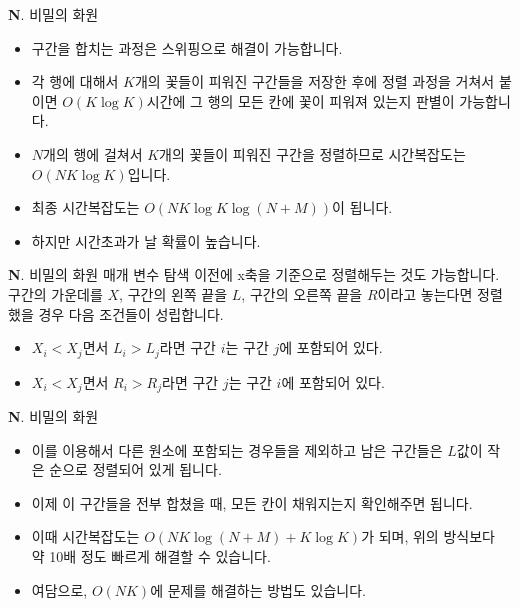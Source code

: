 \begin{frame}{\textbf{N}. 비밀의 화원}
    \begin{itemize}
        \item 구간을 합치는 과정은 스위핑으로 해결이 가능합니다. 
        \item 각 행에 대해서 $K$개의 꽃들이 피워진 구간들을 저장한 후에 정렬 과정을 거쳐서 붙이면 $O(K\log K)$시간에 그 행의 모든 칸에 꽃이 피워져 있는지 판별이 가능합니다.
        \item $N$개의 행에 걸쳐서 $K$개의 꽃들이 피워진 구간을 정렬하므로 시간복잡도는 $O(NK\log K)$입니다.
        \item 최종 시간복잡도는 $O(NK\log K \log(N+M))$이 됩니다.
        \item 하지만 시간초과가 날 확률이 높습니다.
    \end{itemize}
\end{frame}

\begin{frame}{\textbf{N}. 비밀의 화원}
    매개 변수 탐색 이전에 x축을 기준으로 정렬해두는 것도 가능합니다. 
    구간의 가운데를 $X$, 구간의 왼쪽 끝을 $L$, 구간의 오른쪽 끝을 $R$이라고 놓는다면 정렬했을 경우 다음 조건들이 성립합니다.
    \vspace{18pt}
    \begin{itemize}
        \item $X_i<X_j$면서 $L_i>L_j$라면 구간 $i$는 구간 $j$에 포함되어 있다.
        \item $X_i<X_j$면서 $R_i>R_j$라면 구간 $j$는 구간 $i$에 포함되어 있다.
    \end{itemize}
\end{frame}

\begin{frame}{\textbf{N}. 비밀의 화원}
    \begin{itemize}
        \item 이를 이용해서 다른 원소에 포함되는 경우들을 제외하고 남은 구간들은 $L$값이 작은 순으로 정렬되어 있게 됩니다. 
        \item 이제 이 구간들을 전부 합쳤을 때, 모든 칸이 채워지는지 확인해주면 됩니다.
        \item 이때 시간복잡도는 $O(NK \log(N+M)+ K\log K)$가 되며, 위의 방식보다 약 10배 정도 빠르게 해결할 수 있습니다.
        \item 여담으로, $O(NK)$에 문제를 해결하는 방법도 있습니다.
    \end{itemize}
\end{frame}
